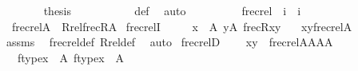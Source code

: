 \begin{isabellebody}
\ \ \ \ \ \ \isamarkupfalse%
\ {\isacharquery}{\kern0pt}thesis\ \isanewline
\ \ \ \ \ \ \ \ \isamarkupfalse%
\ {\isasymGamma}{\isacharunderscore}{\kern0pt}def\ \isamarkupfalse%
\ auto\isanewline
\ \ \ \ \isamarkupfalse%
\isanewline
\ \ \isamarkupfalse%
\isanewline
{}\isamarkupfalse%
%
\endisatagproof
{\isafoldproof}%
%
\isadelimproof
\isanewline
%
\endisadelimproof
\isanewline
{}\isamarkupfalse%
\isanewline
\ \ frecrel\ {\isacharcolon}{\kern0pt}{\isacharcolon}{\kern0pt}\ {\isachardoublequoteopen}i\ {\isasymRightarrow}\ i{\isachardoublequoteclose}\ \isanewline
\ \ {\isachardoublequoteopen}frecrel{\isacharparenleft}{\kern0pt}A{\isacharparenright}{\kern0pt}\ {\isasymequiv}\ Rrel{\isacharparenleft}{\kern0pt}frecR{\isacharcomma}{\kern0pt}A{\isacharparenright}{\kern0pt}{\isachardoublequoteclose}\isanewline
\isanewline
{}\isamarkupfalse%
\ frecrelI\ {\isacharcolon}{\kern0pt}\ \isanewline
\ \ \ {\isachardoublequoteopen}x\ {\isasymin}\ A{\isachardoublequoteclose}\ {\isachardoublequoteopen}y{\isasymin}A{\isachardoublequoteclose}\ {\isachardoublequoteopen}frecR{\isacharparenleft}{\kern0pt}x{\isacharcomma}{\kern0pt}y{\isacharparenright}{\kern0pt}{\isachardoublequoteclose}\isanewline
\ \ \ {\isachardoublequoteopen}{\isasymlangle}x{\isacharcomma}{\kern0pt}y{\isasymrangle}{\isasymin}frecrel{\isacharparenleft}{\kern0pt}A{\isacharparenright}{\kern0pt}{\isachardoublequoteclose}\isanewline
%
\isadelimproof
\ \ %
\endisadelimproof
%
\isatagproof
{}\isamarkupfalse%
\ assms\ \isamarkupfalse%
\ frecrel{\isacharunderscore}{\kern0pt}def\ Rrel{\isacharunderscore}{\kern0pt}def\ \isamarkupfalse%
\ auto%
\endisatagproof
{\isafoldproof}%
%
\isadelimproof
\isanewline
%
\endisadelimproof
\isanewline
{}\isamarkupfalse%
\ frecrelD\ {\isacharcolon}{\kern0pt}\isanewline
\ \ \ {\isachardoublequoteopen}{\isasymlangle}x{\isacharcomma}{\kern0pt}y{\isasymrangle}\ {\isasymin}\ frecrel{\isacharparenleft}{\kern0pt}A{}{\isasymtimes}A{}{\isasymtimes}A{}{\isasymtimes}A{}{\isacharparenright}{\kern0pt}{\isachardoublequoteclose}\isanewline
\ \ \ {\isachardoublequoteopen}ftype{\isacharparenleft}{\kern0pt}x{\isacharparenright}{\kern0pt}\ {\isasymin}\ A{}{\isachardoublequoteclose}\ {\isachardoublequoteopen}ftype{\isacharparenleft}{\kern0pt}x{\isacharparenright}{\kern0pt}\ {\isasymin}\ A{}{\isachardoublequoteclose}\isanewline

\end{isabellebody}
